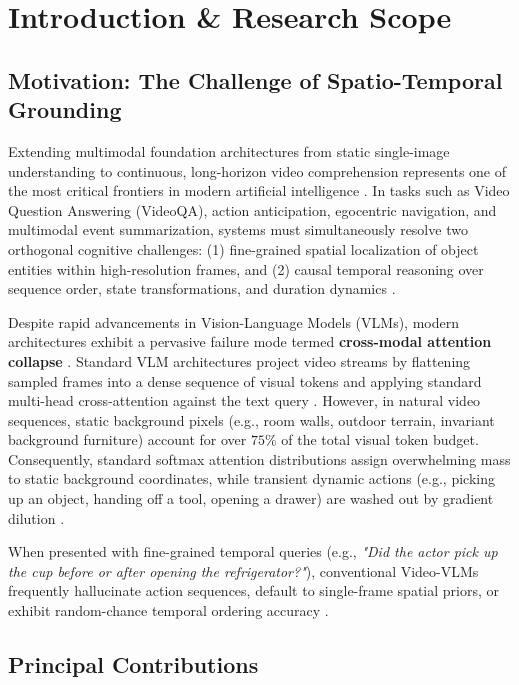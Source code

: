 \documentclass[manuscript,review]{acmart}
\begin{document}
\section{Introduction \& Research Scope}



\subsection{Motivation: The Challenge of Spatio-Temporal Grounding}


Extending multimodal foundation architectures from static single-image understanding to continuous, long-horizon video comprehension represents one of the most critical frontiers in modern artificial intelligence \cite{arxiv_2010_11146,arxiv_2005_14165}. In tasks such as Video Question Answering (VideoQA), action anticipation, egocentric navigation, and multimodal event summarization, systems must simultaneously resolve two orthogonal cognitive challenges: (1) fine-grained spatial localization of object entities within high-resolution frames, and (2) causal temporal reasoning over sequence order, state transformations, and duration dynamics \cite{arxiv_2203_02155,arxiv_2312_03893}.

Despite rapid advancements in Vision-Language Models (VLMs), modern architectures exhibit a pervasive failure mode termed \textbf{cross-modal attention collapse} \cite{arxiv_2406_00584}. Standard VLM architectures project video streams by flattening sampled frames into a dense sequence of visual tokens and applying standard multi-head cross-attention against the text query \cite{arxiv_2305_18290}. However, in natural video sequences, static background pixels (e.g., room walls, outdoor terrain, invariant background furniture) account for over $75\%$ of the total visual token budget. Consequently, standard softmax attention distributions assign overwhelming mass to static background coordinates, while transient dynamic actions (e.g., picking up an object, handing off a tool, opening a drawer) are washed out by gradient dilution \cite{arxiv_2501_02497}.

When presented with fine-grained temporal queries (e.g., \textit{"Did the actor pick up the cup before or after opening the refrigerator?"}), conventional Video-VLMs frequently hallucinate action sequences, default to single-frame spatial priors, or exhibit random-chance temporal ordering accuracy \cite{arxiv_2405_01543,crossref_10_1016_j_aei_2026_104392}.


\subsection{Principal Contributions}
\end{document}
